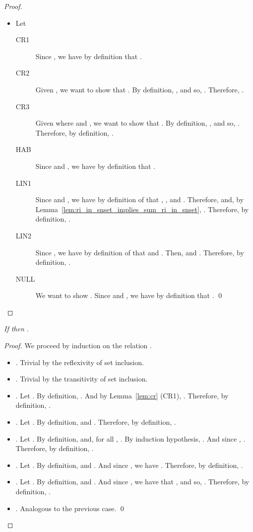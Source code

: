 \documentclass[preprint]{elsarticle}
\newcommand\recap[3]{\noindent {\bf #1 \ref{#2}.} \emph{#3}}
\begin{document}
\begin{proof}
\begin{itemize}
    \item Let 
    \begin{description}
      \item[CR1]
         Since , we have by definition that .
      \item[CR2]
         Given , we want to show that .
        By definition, , and so, . Therefore, .
      \item[CR3]
         Given  where  and , we want to show that .
        By definition, , and so, . Therefore, by definition, .
      \item[HAB]
       Since  and , we have by definition that .
      \item[LIN1]
         Since  and , we have by definition of  that , ,  and . Therefore,  and, by Lemma~\ref{lem:ri_in_snset_implies_sum_ri_in_snset}, . Therefore, by definition, .
      \item[LIN2]
         Since , we have by definition of  that  and . Then,  and . Therefore, by definition, .
      \item[NULL]
         We want to show . Since  and , we have by definition that .
         \qed
    \end{description}
  \end{itemize}
\end{proof}

\recap{Lemma}{lem:a_subset_b}{
  If  then .
}
\begin{proof}
  We proceed by induction on the relation .
  \begin{itemize}
  \item . Trivial by the reflexivity of set inclusion.
  \item . Trivial by the transitivity of set inclusion.
  \item . Let . By definition, . And by Lemma~\ref{lem:cr} (CR1), . Therefore, by definition, .
  \item .
    Let . By definition,  and . Therefore, by definition, .
  \item .
    Let . By definition,  and, for all , . By induction hypothesis, . And since , . Therefore, by definition, .
  \item . Let . By definition,  and . And since , we have . Therefore, by definition, .
  \item . Let . By definition,  and . And since , we have that , and so, . Therefore, by definition, .
  \item . Analogous to the previous case.
  \qed
  \end{itemize}
\end{proof}
\end{document}
